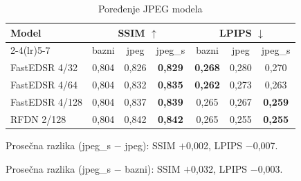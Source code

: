 \begin{table}[H]
    \begin{tabular}{lcccccc}
        \toprule
        Model & \multicolumn{3}{c}{SSIM $\uparrow$} & \multicolumn{3}{c}{LPIPS $\downarrow$} \\
        \cmidrule(lr){2-4}\cmidrule(lr){5-7}
         & bazni & jpeg & jpeg\_s & bazni & jpeg & jpeg\_s \\
        \midrule
        FastEDSR 4/32 & 0,804 & 0,826 & \textbf{0,829} & \textbf{0,268} & 0,280 & 0,270 \\
        FastEDSR 4/64 & 0,804 & 0,832 & \textbf{0,835} & \textbf{0,262} & 0,273 & 0,263 \\
        FastEDSR 4/128 & 0,804 & 0,837 & \textbf{0,839} & 0,265 & 0,267 & \textbf{0,259} \\
        RFDN 2/128 & 0,804 & 0,842 & \textbf{0,842} & 0,265 & 0,255 & \textbf{0,255} \\
        \bottomrule
    \end{tabular}
    \caption{Poređenje JPEG modela}
    \label{tab:jpeg_DIV2K_jpeg_vs_s}
\end{table}

\noindent Prosečna razlika (jpeg\_s $-$ jpeg): SSIM $+$0,002, LPIPS $-$0,007.

\noindent Prosečna razlika (jpeg\_s $-$ bazni): SSIM $+$0,032, LPIPS $-$0,003.